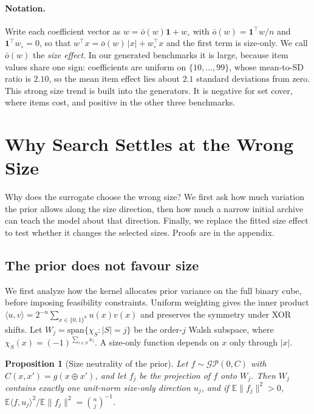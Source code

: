 \documentclass{article}
\newcommand{\revtext}[1]{{\color{blue}#1}}
\providecommand{\one}{\mathbf 1}
\providecommand{\off}{\bar o}
\newtheorem{proposition}{Proposition}
\theoremstyle{remark}\newtheorem{remark}[proposition]{Remark}
\begin{document}
\paragraph{Notation.}
Write each coefficient vector as $w=\off(w)\one+w_\circ$ with
$\off(w)=\one^\top w/n$ and $\one^\top w_\circ=0$, so that
$w^\top x=\off(w)\,|x|+w_\circ^\top x$ and the first term is size-only. We call $\off(w)$ the \emph{size effect}. In our generated benchmarks it is large,
because item values share one sign: coefficients are uniform on
$\{10,\dots,99\}$, whose mean-to-SD ratio is $2.10$, \revtext{so the mean item effect lies about $2.1$ standard deviations from zero. This strong size trend is built into the generators.} It is negative for set cover, where items cost, and
positive in the other three benchmarks.



\section{Why Search Settles at the Wrong Size}\label{sec:diagnosis}

\revtext{Why does the surrogate choose the wrong size? We first ask how much variation the prior allows along the size direction, then how much a narrow initial archive can teach the model about that direction. Finally, we replace the fitted size effect to test whether it changes the selected sizes.} Proofs are in the appendix.

\subsection{The prior does not favour size}\label{sec:blind}

\revtext{We first analyze how the kernel allocates prior variance on the full binary cube, before imposing feasibility constraints. Uniform weighting gives the inner product $\langle u,v\rangle=2^{-n}\sum_{x\in\{0,1\}^n}u(x)v(x)$ and preserves the symmetry under XOR shifts. Let $W_j=\mathrm{span}\{\chi_S:|S|=j\}$ be the order-$j$ Walsh subspace, where $\chi_S(x)=(-1)^{\sum_{i\in S}x_i}$. A size-only function depends on $x$ only through $|x|$.}

\begin{proposition}[Size neutrality of the prior]\label{prop:blind}
Let $f\sim\mathcal{GP}(0,C)$ with $C(x,x')=g(x\oplus x')$, and let $f_j$ be the
projection of $f$ onto $W_j$. Then $W_j$ contains exactly one unit-norm size-only
direction $u_j$, and if $\mathbb E\|f_j\|^2>0$,
$\mathbb E\langle f,u_j\rangle^2/\mathbb E\|f_j\|^2=\binom nj^{-1}$.
\end{proposition}
\end{document}
